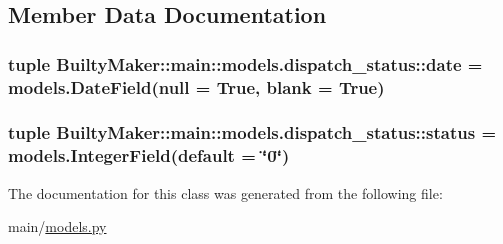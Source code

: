 \subsection{\-Member \-Data \-Documentation}
\hypertarget{classBuiltyMaker_1_1main_1_1models_1_1dispatch__status_a9d28ee2995889245a4215886dac05fee}{
\subsubsection[{date}]{\setlength{\rightskip}{0pt plus 5cm}tuple {\bf \-Builty\-Maker\-::main\-::models.\-dispatch\-\_\-status\-::date} = models.\-Date\-Field(null = \-True, blank = \-True)}}\label{classBuiltyMaker_1_1main_1_1models_1_1dispatch__status_a9d28ee2995889245a4215886dac05fee}
\hypertarget{classBuiltyMaker_1_1main_1_1models_1_1dispatch__status_af0f61dbc1de0bd586addfd370ab5e3e2}{
\subsubsection[{status}]{\setlength{\rightskip}{0pt plus 5cm}tuple {\bf \-Builty\-Maker\-::main\-::models.\-dispatch\-\_\-status\-::status} = models.\-Integer\-Field(default = \char`\"{}0\char`\"{})}}\label{classBuiltyMaker_1_1main_1_1models_1_1dispatch__status_af0f61dbc1de0bd586addfd370ab5e3e2}


\-The documentation for this class was generated from the following file\-:\begin{DoxyCompactItemize}
\item 
main/\hyperlink{models_8py}{models.\-py}\end{DoxyCompactItemize}
